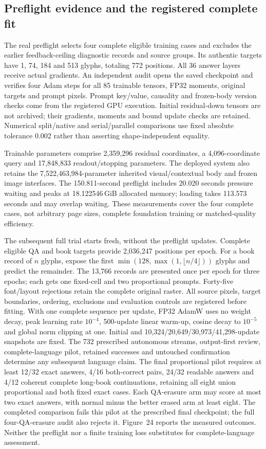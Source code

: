 \subsection*{Preflight evidence and the registered complete fit}
The real preflight selects four complete eligible training cases and excludes
the earlier feedback-ceiling diagnostic records and source groups. Its authentic
targets have 1, 74, 184 and 513 glyphs, totaling 772 positions. All 36 answer
layers receive actual gradients. An independent audit opens the saved checkpoint
and verifies four Adam steps for all 85 trainable tensors, FP32 moments,
original targets and prompt pixels. Prompt key/value, causality and frozen-body
version checks come from the registered GPU execution. Initial residual-down
tensors are not archived; their gradients, moments and bound update checks
are retained. Numerical split/native and serial/parallel comparisons use fixed
absolute tolerance 0.002 rather than asserting shape-independent equality.

Trainable parameters comprise 2,359,296 residual coordinates, a 4,096-coordinate
query and 17,848,833 readout/stopping parameters. The deployed system also retains
the 7,522,463,984-parameter inherited visual/contextual body and frozen image
interfaces. The 150.811-second preflight includes 20.020 seconds pressure waiting
and peaks at 18.122546\,GiB allocated memory; loading takes 113.573 seconds and
may overlap waiting. These measurements cover the four complete cases, not
arbitrary page sizes, complete foundation training or matched-quality efficiency.

The subsequent full trial starts fresh, without the preflight updates. Complete
eligible QA and book targets provide 2,036,247 positions per epoch. For a book
record of $n$ glyphs, expose the first
$\min(128,\max(1,\lfloor n/4\rfloor))$ glyphs and predict
the remainder. The 13,766 records are presented once per epoch for three epochs;
each gets one fixed-cell and two proportional prompts. Forty-five font/layout
rejections retain the complete original raster. All source pixels, target
boundaries, ordering, exclusions and evaluation controls are registered before
fitting. With one complete sequence per update, FP32 AdamW uses no weight decay,
peak learning rate $10^{-4}$, 500-update linear warm-up, cosine decay to $10^{-5}$
and global norm clipping at one. Initial and 10,324/20,649/30,973/41,298-update
snapshots are fixed. The 732 prescribed autonomous streams, output-first review,
complete-language pilot, retained successes and untouched confirmation determine
any subsequent language claim. The final proportional pilot requires at least
12/32 exact answers, 4/16 both-correct pairs, 24/32 readable answers and 4/12
coherent complete long-book continuations, retaining all eight union proportional
and both fixed exact cases. Each QA-erasure arm may score at most two exact
answers, with normal minus the better erased arm at least eight. The completed
comparison fails this pilot at the prescribed final checkpoint; the full
four-QA-erasure audit also rejects it. Figure~24
reports the measured outcomes. Neither the preflight nor a finite training
loss substitutes for complete-language assessment.

